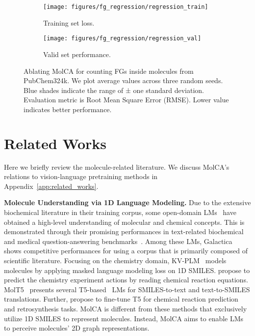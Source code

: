 \documentclass[11pt]{article}
\begin{document}
\begin{figure}[t]
\centering
\small
\begin{subfigure}[t]{0.235\textwidth}
\centering
\texttt{[image: figures/fg\_regression/regression\_train]}
\caption{Training set loss.}
\label{fig:regression_train}            
\end{subfigure}
\begin{subfigure}[t]{0.24\textwidth}
\centering
\texttt{[image: figures/fg\_regression/regression\_val]}
\caption{Valid set performance.}
\label{fig:regression_valid}            
\end{subfigure}
\caption{Ablating MolCA for counting FGs inside molecules from PubChem324k. We plot average values across three random seeds. Blue shades indicate the range of ± one standard deviation. 
Evaluation metric is Root Mean Square Error (RMSE). Lower value indicates better performance.}
 \vspace{-5mm}
\label{fig:regression}
\end{figure}



 \section{Related Works}

 \vspace{-2mm}
Here we briefly review the molecule-related literature. We discuss MolCA's relations to vision-language pretraining methods in Appendix~\ref{app:related_works}.


\textbf{Molecule Understanding via 1D Language Modeling.} Due to the extensive biochemical literature in their training corpus, some open-domain LMs~\cite{OPT,LLama,PALM} have obtained a high-level understanding of molecular and chemical concepts. This is demonstrated through their promising performances in text-related biochemical and medical question-answering benchmarks~\cite{MMLU, PubMedQA}. Among these LMs, Galactica~\cite{Galactica} shows competitive performances for using a corpus that is primarily composed of scientific literature. Focusing on the chemistry domain, KV-PLM~\citep{KVPLM} models molecules by applying masked language modeling loss on 1D SMILES. \citet{Smiles2actions} propose to predict the chemistry experiment actions by reading chemical reaction equations. MolT5~\citep{MolT5} presents several T5-based~\cite{T5} LMs for SMILES-to-text and text-to-SMILES translations. Further, \citet{TextChemT5} propose to fine-tune T5 for chemical reaction prediction and retrosynthesis tasks. MolCA is different from these methods that exclusively utilize 1D SMILES to represent molecules. Instead, MolCA aims to enable LMs to perceive molecules' 2D graph representations.
\end{document}
